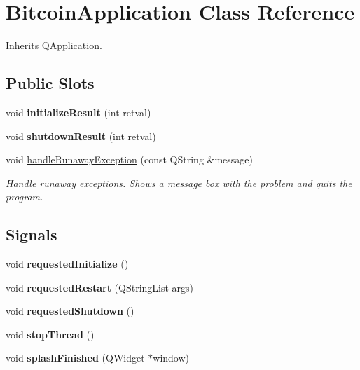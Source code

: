 \hypertarget{class_bitcoin_application}{}\section{Bitcoin\+Application Class Reference}
\label{class_bitcoin_application}


Inherits Q\+Application.

\subsection*{Public Slots}
\begin{DoxyCompactItemize}
\item 
\mbox{\label{class_bitcoin_application_aceb08b4063e4fb264cf11cf7f9edd969}} 
void {\bfseries initialize\+Result} (int retval)
\item 
\mbox{\label{class_bitcoin_application_ab5f7ccaede7e0bd417627c03ccbe20e6}} 
void {\bfseries shutdown\+Result} (int retval)
\item 
\mbox{\label{class_bitcoin_application_a77999ba9fde6eaaa0f9a0d4313ca3855}} 
void \mbox{\hyperlink{class_bitcoin_application_a77999ba9fde6eaaa0f9a0d4313ca3855}{handle\+Runaway\+Exception}} (const Q\+String \&message)
\begin{DoxyCompactList}\small\item\em Handle runaway exceptions. Shows a message box with the problem and quits the program. \end{DoxyCompactList}\end{DoxyCompactItemize}
\subsection*{Signals}
\begin{DoxyCompactItemize}
\item 
\mbox{\label{class_bitcoin_application_a1d523693dd9473db887a8dabea1fd6e5}} 
void {\bfseries requested\+Initialize} ()
\item 
\mbox{\label{class_bitcoin_application_a1bea4299d3c9ec6b063d1413aca9b738}} 
void {\bfseries requested\+Restart} (Q\+String\+List args)
\item 
\mbox{\label{class_bitcoin_application_aa18558117bf6e7ba458d0ce05f2ef6e6}} 
void {\bfseries requested\+Shutdown} ()
\item 
\mbox{\label{class_bitcoin_application_a7f117b69142316e07e0292a1b11f0768}} 
void {\bfseries stop\+Thread} ()
\item 
\mbox{\label{class_bitcoin_application_a2beb256cc754bcce12f6690e7e1c57db}} 
void {\bfseries splash\+Finished} (Q\+Widget $\ast$window)
\end{DoxyCompactItemize}
